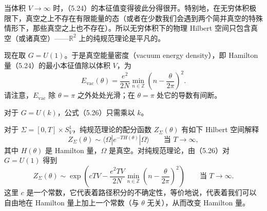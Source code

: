 
当体积 $V\to\infty$ 时，（5.24）的本征值变得彼此分得很开。特别地，在无穷体积极限下，真空之上不存在有限能量的态（或者在少数我们会遇到两个简并真空的特殊情形下，那些真空之上也不存在）。所以无穷体积下的物理 Hilbert 空间只包含真空（或诸真空）——$\mathbb{R}^2$ 上的纯规范理论是平凡的。

现在取 $G=U(1)$。于是真空能量密度（vacuum energy density），即 Hamilton 量（5.24）的最小本征值除以体积 $V$，为
\begin{equation}
  \tag{5.26}
  \label{eq:5-26}
  E_{\mathrm{vac}}(\theta)=\frac{e^2}{2N}\min_{n\in\mathbb{Z}}\left(n-\frac{\theta}{2\pi}\right)^2.
\end{equation}
请注意，$E_{\mathrm{vac}}$ 除 $\theta=\pi$ 之外处处光滑；在 $\theta=\pi$ 处它的导数有间断。


对于 $G=U(k)$，公式（5.26）只需乘以 $k$。

对于 $\Sigma=[0,T]\times S^1_V$，纯规范理论的配分函数 $Z_\Sigma(\theta)$ 有如下 Hilbert 空间解释
\[
  Z_\Sigma(\theta)\sim\langle\Omega|e^{-TH(\theta)}|\Omega\rangle\qquad\text{当 }T\to\infty,
\]
其中 $H(\theta)$ 是 Hamilton 量，$\Omega$ 是真空。对纯规范理论，由（5.26）对 $G=U(1)$ 得到
\begin{equation}
  \tag{5.27}
  \label{eq:5-27}
  Z_\Sigma(\theta)\sim\exp\left(cTV-\frac{e^2TV}{2N}\min_{n\in\mathbb{Z}}\left(n-\frac{\theta}{2\pi}\right)^2\right)\qquad\text{当 }T\to\infty.
\end{equation}
这里 $c$ 是一个常数，它代表着路径积分的不确定性，等价地说，代表着我们可以自由地在 Hamilton 量上加上一个常数（与 $\theta$ 无关），从而改变 Hamilton 量。

